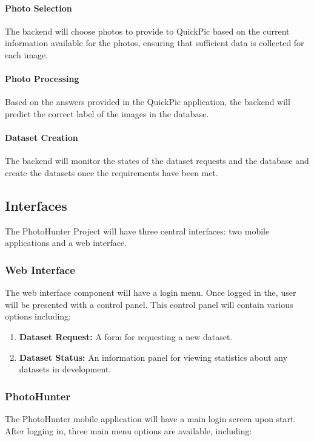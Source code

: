 \documentclass{article}
\begin{document}
  \paragraph{Photo Selection}
  The backend will choose photos to provide to QuickPic based on the current
  information available for the photos, ensuring that sufficient data is collected
  for each image.

  \paragraph{Photo Processing}
  Based on the answers provided in the QuickPic application, the backend will
  predict the correct label of the images in the database.

  \paragraph{Dataset Creation}
  The backend will monitor the states of the dataset requests and the database
  and create the datasets once the requirements have been met.

\subsection{Interfaces}
The PhotoHunter Project will have three central interfaces: two mobile
applications and a web interface.

\subsubsection{Web Interface}
The web interface component will have a login menu. Once logged in the, user
will be presented with a control panel. This control panel will contain various
options including:

\begin{enumerate}

  \item \textbf{Dataset Request:} A form for requesting a new dataset.

  \item \textbf{Dataset Status:} An information panel for viewing statistics
        about any datasets in development.

\end{enumerate}

\subsubsection{PhotoHunter}
The PhotoHunter mobile application will have a main login screen upon start.
After logging in, three main menu options are available, including:
\end{document}
